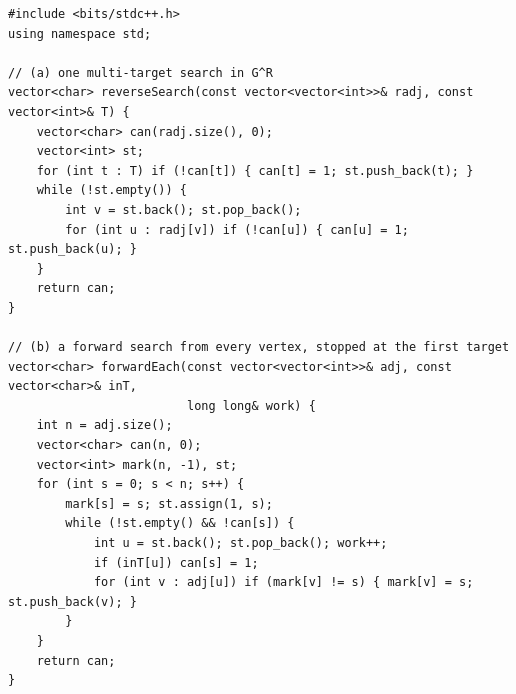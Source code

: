 \begin{solutionbox}
\begin{lstlisting}[style=cpp]
#include <bits/stdc++.h>
using namespace std;

// (a) one multi-target search in G^R
vector<char> reverseSearch(const vector<vector<int>>& radj, const vector<int>& T) {
    vector<char> can(radj.size(), 0);
    vector<int> st;
    for (int t : T) if (!can[t]) { can[t] = 1; st.push_back(t); }
    while (!st.empty()) {
        int v = st.back(); st.pop_back();
        for (int u : radj[v]) if (!can[u]) { can[u] = 1; st.push_back(u); }
    }
    return can;
}

// (b) a forward search from every vertex, stopped at the first target
vector<char> forwardEach(const vector<vector<int>>& adj, const vector<char>& inT,
                         long long& work) {
    int n = adj.size();
    vector<char> can(n, 0);
    vector<int> mark(n, -1), st;
    for (int s = 0; s < n; s++) {
        mark[s] = s; st.assign(1, s);
        while (!st.empty() && !can[s]) {
            int u = st.back(); st.pop_back(); work++;
            if (inT[u]) can[s] = 1;
            for (int v : adj[u]) if (mark[v] != s) { mark[v] = s; st.push_back(v); }
        }
    }
    return can;
}


\end{lstlisting}
\end{solutionbox}
